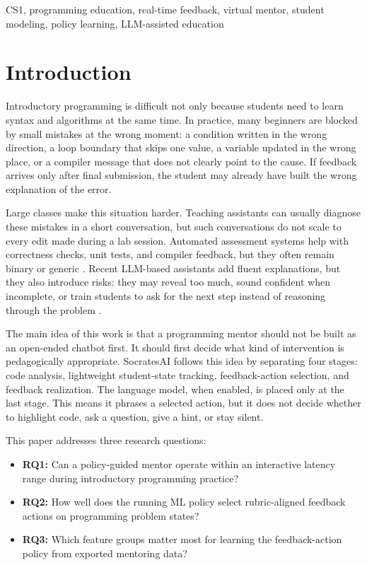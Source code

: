 \documentclass[conference]{IEEEtran}
\begin{document}
\begin{IEEEkeywords}
CS1, programming education, real-time feedback, virtual mentor, student modeling, policy learning, LLM-assisted education
\end{IEEEkeywords}

\section{Introduction}

Introductory programming is difficult not only because students need to learn syntax and algorithms at the same time. In practice, many beginners are blocked by small mistakes at the wrong moment: a condition written in the wrong direction, a loop boundary that skips one value, a variable updated in the wrong place, or a compiler message that does not clearly point to the cause. If feedback arrives only after final submission, the student may already have built the wrong explanation of the error.

Large classes make this situation harder. Teaching assistants can usually diagnose these mistakes in a short conversation, but such conversations do not scale to every edit made during a lab session. Automated assessment systems help with correctness checks, unit tests, and compiler feedback, but they often remain binary or generic \cite{NavigatingAutomatedFeedback,AutomatedGradingandFeedbackToolsforProgrammingEducationSystematicReview}. Recent LLM-based assistants add fluent explanations, but they also introduce risks: they may reveal too much, sound confident when incomplete, or train students to ask for the next step instead of reasoning through the problem \cite{CodeAid,IRIS,PatternsofLLMPoweredProgrammingAssistant,FeasibilityStudyofAugmentingTeachingAssistantswithAI}.

The main idea of this work is that a programming mentor should not be built as an open-ended chatbot first. It should first decide what kind of intervention is pedagogically appropriate. SocratesAI follows this idea by separating four stages: code analysis, lightweight student-state tracking, feedback-action selection, and feedback realization. The language model, when enabled, is placed only at the last stage. This means it phrases a selected action, but it does not decide whether to highlight code, ask a question, give a hint, or stay silent.

This paper addresses three research questions:

\begin{itemize}
    \item \textbf{RQ1:} Can a policy-guided mentor operate within an interactive latency range during introductory programming practice?
    \item \textbf{RQ2:} How well does the running ML policy select rubric-aligned feedback actions on programming problem states?
    \item \textbf{RQ3:} Which feature groups matter most for learning the feedback-action policy from exported mentoring data?
\end{itemize}
\end{document}
